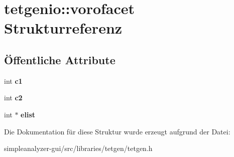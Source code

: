\hypertarget{structtetgenio_1_1vorofacet}{\section{tetgenio\-:\-:vorofacet Strukturreferenz}
\label{structtetgenio_1_1vorofacet}
}
\subsection*{Öffentliche Attribute}
\begin{DoxyCompactItemize}
\item 
\hypertarget{structtetgenio_1_1vorofacet_a69fcc657a17f0e4565d734fbb34b3239}{int {\bfseries c1}}\label{structtetgenio_1_1vorofacet_a69fcc657a17f0e4565d734fbb34b3239}

\item 
\hypertarget{structtetgenio_1_1vorofacet_a368f7dcb47dc65f5655570e942f1e414}{int {\bfseries c2}}\label{structtetgenio_1_1vorofacet_a368f7dcb47dc65f5655570e942f1e414}

\item 
\hypertarget{structtetgenio_1_1vorofacet_a7dc623ea5f4a6006fcc20b2bc8a1f560}{int $\ast$ {\bfseries elist}}\label{structtetgenio_1_1vorofacet_a7dc623ea5f4a6006fcc20b2bc8a1f560}

\end{DoxyCompactItemize}


Die Dokumentation für diese Struktur wurde erzeugt aufgrund der Datei\-:\begin{DoxyCompactItemize}
\item 
simpleanalyzer-\/gui/src/libraries/tetgen/tetgen.\-h\end{DoxyCompactItemize}
